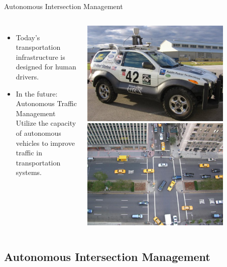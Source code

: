 \documentclass{beamer}
\begin{document}
\begin{frame}{Autonomous Intersection Management}
\begin{columns}[c]
		\begin{itemize}
		\item Today’s transportation infrastructure is designed for
		human drivers.
		\item In the future: Autonomous Traffic Management\\
		Utilize the capacity of autonomous vehicles to improve traffic
		in transportation systems.
		\end{itemize}
		
		\includegraphics[width=0.8\textwidth]{42.png}
		\hfill
		\includegraphics[width=0.8\textwidth]{intersection.jpg}
\end{columns}
\end{frame}

\subsection{Autonomous Intersection Management}
\end{document}
